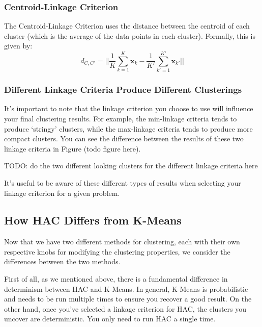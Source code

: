 \subsubsection{Centroid-Linkage Criterion}
The Centroid-Linkage Criterion uses the distance between the centroid of each cluster (which is the average of the data points in each cluster). Formally, this is given by:
\begin{equation} \label{cent-linkage-crit}
	d_{C, C'} = || \frac{1}{K} \sum_{k=1}^{K} \textbf{x}_{k} - \frac{1}{K'} \sum_{k'=1}^{K'} \textbf{x}_{k'} ||
\end{equation}

\subsubsection{Different Linkage Criteria Produce Different Clusterings}
It's important to note that the linkage criterion you choose to use will influence your final clustering results. For example, the min-linkage criteria tends to produce `stringy' clusters, while the max-linkage criteria tends to produce more compact clusters. You can see the difference between the results of these two linkage criteria in Figure (todo figure here).

TODO: do the two different looking clusters for the different linkage criteria here

It's useful to be aware of these different types of results when selecting your linkage criterion for a given problem.


\subsection{How HAC Differs from K-Means}
Now that we have two different methods for clustering, each with their own respective knobs for modifying the clustering properties, we consider the differences between the two methods.

First of all, as we mentioned above, there is a fundamental difference in determinism between HAC and K-Means. In general, K-Means is probabilistic and needs to be run multiple times to ensure you recover a good result. On the other hand, once you've selected a linkage criterion for HAC, the clusters you uncover are deterministic. You only need to run HAC a single time.

